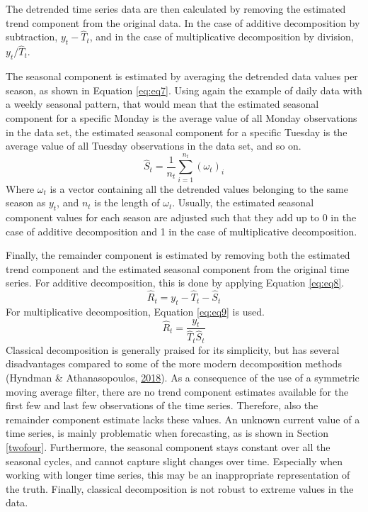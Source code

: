 \documentclass[12pt,oneside]{reedthesis}
\begin{document}
The detrended time series data are then calculated by removing the
estimated trend component from the original data. In the case of
additive decomposition by subtraction, \(y_{t} - \hat{T}_{t}\), and in
the case of multiplicative decomposition by division,
\(y_{t}/\hat{T}_{t}\).

The seasonal component is estimated by averaging the detrended data
values per season, as shown in Equation \eqref{eq:eq7}. Using again the
example of daily data with a weekly seasonal pattern, that would mean
that the estimated seasonal component for a specific Monday is the
average value of all Monday observations in the data set, the estimated
seasonal component for a specific Tuesday is the average value of all
Tuesday observations in the data set, and so on.
\begin{equation}
\hat{S}_{t} = \frac{1}{n_{t}}\sum_{i=1}^{n_{t}}(\omega_{t})_{i}
\label{eq:eq7}
\end{equation}
Where \(\omega_{t}\) is a vector containing all the detrended values
belonging to the same season as \(y_{t}\), and \(n_{t}\) is the length
of \(\omega_{t}\). Usually, the estimated seasonal component values for
each season are adjusted such that they add up to 0 in the case of
additive decomposition and 1 in the case of multiplicative
decomposition.

Finally, the remainder component is estimated by removing both the
estimated trend component and the estimated seasonal component from the
original time series. For additive decomposition, this is done by
applying Equation \eqref{eq:eq8}.
\begin{equation}
\hat{R}_{t} = y_{t} - \hat{T}_{t} - \hat{S}_{t}
\label{eq:eq8}
\end{equation}
For multiplicative decomposition, Equation \eqref{eq:eq9} is used.
\begin{equation}
\hat{R}_{t} = \frac{y_{t}}{\hat{T}_{t}\hat{S}_{t}}
\label{eq:eq9}
\end{equation}
Classical decomposition is generally praised for its simplicity, but has
several disadvantages compared to some of the more modern decomposition
methods (Hyndman \& Athanasopoulos,
\protect\hyperlink{ref-hyndman2018fpp}{2018}). As a consequence of the
use of a symmetric moving average filter, there are no trend component
estimates available for the first few and last few observations of the
time series. Therefore, also the remainder component estimate lacks
these values. An unknown current value of a time series, is mainly
problematic when forecasting, as is shown in Section \ref{twofour}.
Furthermore, the seasonal component stays constant over all the seasonal
cycles, and cannot capture slight changes over time. Especially when
working with longer time series, this may be an inappropriate
representation of the truth. Finally, classical decomposition is not
robust to extreme values in the data.
\end{document}

